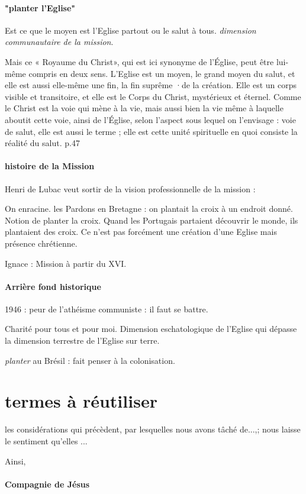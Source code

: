 \paragraph{"planter l'Eglise"}
Est ce que le moyen est l'Eglise partout ou le salut à tous. \textit{dimension communautaire de la mission}.
\begin{singlequote}
    Mais ce « Royaume du Christ», qui est ici synonyme de l'Église, peut être lui-même compris en deux sens. L'Eglise est un moyen, le grand moyen du salut, et elle est aussi elle-même une fin, la fin suprême ·de la création. Elle est un corps visible et transitoire, et elle est le Corps du Christ, mystérieux et éternel. Comme le Christ est la voie qui mène à la vie, mais aussi bien la vie même à laquelle aboutit cette voie, ainsi de l'Église, selon l'aspect sous lequel on l'envisage : voie de salut, elle est aussi le terme ; elle est cette unité spirituelle en quoi consiste la réalité du salut. p.47
\end{singlequote}

\paragraph{histoire de la Mission} Henri de Lubac veut sortir de la vision professionnelle de la mission : 
\begin{singlequote}
    On enracine. les Pardons en Bretagne : on plantait la croix à un endroit donné. 
    Notion de planter la croix. Quand les Portugais partaient découvrir le monde, ils plantaient des croix.
    Ce n'est pas forcément une création d'une Eglise mais présence chrétienne.

    Ignace : Mission à partir du XVI. 

    
\end{singlequote}

\paragraph{Arrière fond historique} 1946 : peur de l'athéisme communiste : il faut se battre. 
\begin{Synthesis}
    Charité pour tous et pour moi.
    Dimension eschatologique de l'Eglise qui dépasse la dimension terrestre de l'Eglise sur terre.  
\end{Synthesis}

\textit{planter} au Brésil : fait penser à la colonisation. 
\section{termes à réutiliser}

les considérations qui précèdent, par lesquelles nous avons tâché de...,; nous laisse le sentiment qu'elles ...

Ainsi,


\paragraph{Compagnie de Jésus}
\begin{singlequote}
    
\end{singlequote}




